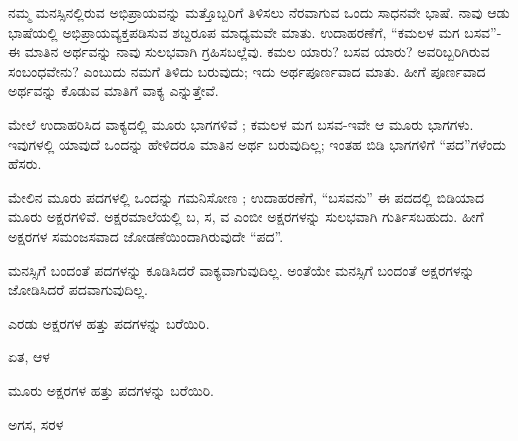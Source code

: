 \kbvbooktitle


\indent ನಮ್ಮ ಮನಸ್ಸಿನಲ್ಲಿರುವ ಅಭಿಪ್ರಾಯವನ್ನು ಮತ್ತೊಬ್ಬರಿಗೆ ತಿಳಿಸಲು ನೆರವಾಗುವ ಒಂದು ಸಾಧನವೇ ಭಾಷೆ. ನಾವು ಆಡು ಭಾಷೆಯಲ್ಲಿ ಅಭಿಪ್ರಾಯವ್ಯಕ್ತಪಡಿಸುವ ಶಬ್ದರೂಪ ಮಾಧ್ಯಮವೇ ಮಾತು. ಉದಾಹರಣೆಗೆ, “ಕಮಲಳ ಮಗ ಬಸವ”-ಈ ಮಾತಿನ ಅರ್ಥವನ್ನು ನಾವು ಸುಲಭವಾಗಿ ಗ್ರಹಿಸಬಲ್ಲೆವು. ಕಮಲ ಯಾರು? ಬಸವ ಯಾರು? ಅವರಿಬ್ಬರಿಗಿರುವ ಸಂಬಂಧವೇನು? ಎಂಬುದು ನಮಗೆ ತಿಳಿದು ಬರುವುದು; ಇದು ಅರ್ಥಪೂರ್ಣವಾದ ಮಾತು. ಹೀಗೆ ಪೂರ್ಣವಾದ ಅರ್ಥವನ್ನು ಕೊಡುವ ಮಾತಿಗೆ ವಾಕ್ಯ ಎನ್ನುತ್ತೇವೆ.\par

\indent ಮೇಲೆ ಉದಾಹರಿಸಿದ ವಾಕ್ಯದಲ್ಲಿ ಮೂರು ಭಾಗಗಳಿವೆ ; ಕಮಲಳ ಮಗ ಬಸವ-ಇವೇ ಆ ಮೂರು ಭಾಗಗಳು. ಇವುಗಳಲ್ಲಿ ಯಾವುದೆ ಒಂದನ್ನು ಹೇಳಿದರೂ ಮಾತಿನ ಅರ್ಥ ಬರುವುದಿಲ್ಲ; ಇಂತಹ ಬಿಡಿ ಭಾಗಗಳಿಗೆ “ಪದ”ಗಳೆಂದು ಹೆಸರು.\par

\indent ಮೇಲಿನ ಮೂರು ಪದಗಳಲ್ಲಿ ಒಂದನ್ನು ಗಮನಿಸೋಣ ; ಉದಾಹರಣೆಗೆ, “ಬಸವನು” ಈ ಪದದಲ್ಲಿ ಬಿಡಿಯಾದ ಮೂರು ಅಕ್ಷರಗಳಿವೆ. ಅಕ್ಷರಮಾಲೆಯಲ್ಲಿ ಬ, ಸ, ವ ಎಂಬೀ ಅಕ್ಷರಗಳನ್ನು ಸುಲಭವಾಗಿ ಗುರ್ತಿಸಬಹುದು. ಹೀಗೆ ಅಕ್ಷರಗಳ ಸಮಂಜಸವಾದ ಜೋಡಣೆಯಿಂದಾಗಿರುವುದೇ “ಪದ”.\par

\indent ಮನಸ್ಸಿಗೆ ಬಂದಂತೆ ಪದಗಳನ್ನು ಕೂಡಿಸಿದರೆ ವಾಕ್ಯವಾಗುವುದಿಲ್ಲ. ಅಂತೆಯೇ ಮನಸ್ಸಿಗೆ ಬಂದಂತೆ ಅಕ್ಷರಗಳನ್ನು ಜೋಡಿಸಿದರೆ ಪದವಾಗುವುದಿಲ್ಲ.\par


\vspace{2.5pt plus 3pt minus 0.5pt}\noindent\hspace*{1.2em}\hspace{0.55em}ಎರಡು ಅಕ್ಷರಗಳ ಹತ್ತು ಪದಗಳನ್ನು ಬರೆಯಿರಿ.\par

\noindent\hspace*{1.2em}\hspace{0.6em}ಏತ, ಆಳ\par

\vspace{2.5pt plus 3pt minus 0.5pt}\noindent\hspace*{1.2em}\hspace{0.55em}ಮೂರು ಅಕ್ಷರಗಳ ಹತ್ತು ಪದಗಳನ್ನು ಬರೆಯಿರಿ.\par

\noindent\hspace*{1.2em}\hspace{0.6em}ಅಗಸ, ಸರಳ\par
